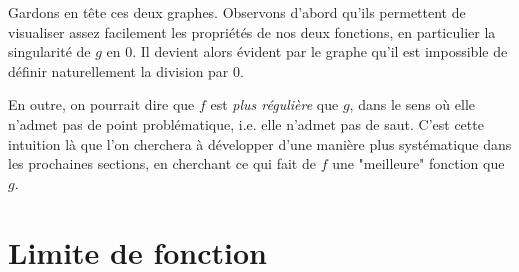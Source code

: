 Gardons en tête ces deux graphes. Observons d'abord qu'ils permettent de visualiser assez facilement les propriétés de nos deux fonctions, en particulier la singularité de $g$ en 0. Il devient alors évident par le graphe qu'il est impossible de définir naturellement la division par $0$.

En outre, on pourrait dire que $f$ est \emph{plus régulière} que $g$, dans le sens où elle n'admet pas de point problématique, i.e. elle n'admet pas de saut. C'est cette intuition là que l'on cherchera à développer d'une manière plus systématique dans les prochaines sections, en cherchant ce qui fait de $f$ une "meilleure" fonction que $g$.

\section{Limite de fonction}
